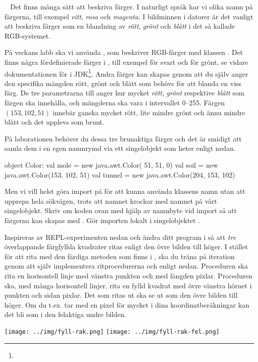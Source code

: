 \Task \what~ Det finns många sätt att beskriva färger.
I naturligt språk har vi olika namn på färgerna, till exempel \emph{vitt}, \emph{rosa} och \emph{magenta}.
I bildminnen i datorer är det vanligt att beskriva färger som en blandning av \emph{rött}, \emph{grönt} och \emph{blått} i det så kallade RGB-systemet.

På veckans labb ska vi använda , som beskriver RGB-färger med klassen .
Det finns några fördefinierade färger i , till exempel  för svart och  för grönt, se vidare dokumentationen för  i JDK\footnote{\JDKApiUrl}.
Andra färger kan skapas genom att du själv anger den specifika mängden rött, grönt och blått som behövs för att blanda en viss färg.
De tre parametrarna till  anger hur mycket \emph{rött}, \emph{grönt} respektive \emph{blått} som färgen ska innehålla, och mängderna ska vara i intervallet 0--255.
Färgen $(153, 102, 51)$ innebär ganska mycket rött, lite mindre grönt och ännu mindre blått och det upplevs som brunt.


\Subtask
På laborationen behöver du dessa tre brunaktiga färger och det är smidigt att samla dem i en egen namnrymd via ett singelobjekt som heter  enligt nedan.
\begin{Code}
object Color:
  val mole   = new java.awt.Color( 51,  51,   0)
  val soil   = new java.awt.Color(153, 102,  51)
  val tunnel = new java.awt.Color(204, 153, 102)
\end{Code}
\noindent Men vi vill helst göra import på  för att kunna använda klassens namn utan att upprepa hela sökvägen, trots att namnet krockar med namnet på vårt singelobjekt. Skriv om koden ovan med hjälp av namnbyte vid import så att färgerna kan skapas med . Gör importen lokalt i singelobjektet .



\noindent\begin{minipage}{0.82\textwidth}
\Subtask Inspireras av REPL-experimenten nedan och ändra ditt program i  så att \emph{tre} överlappande färgfyllda kvadrater ritas enligt den övre bilden till höger. I stället för att rita med den färdiga metoden  som finns i , ska du träna på iteration genom att själv implementera ritprocedurerna  och  enligt nedan.
  Proceduren  ska rita en horisontell linje med vänstra punkten  och med längden  pixlar. Proceduren  ska, med många horisontell linjer, rita en fylld kvadrat med övre vänstra hörnet i punkten  och sidan  pixlar. Det som ritas ut ska se ut som den övre bilden till höger. Om du t.ex. tar med en pixel för mycket i dina koordinatberäkningar kan det bli som i den felaktiga undre bilden.
\end{minipage}
\hfill\begin{minipage}{0.23\textwidth}
\texttt{[image: ../img/fyll-rak.png]}
\texttt{[image: ../img/fyll-rak-fel.png]}

\end{minipage}

